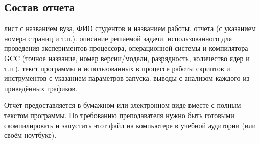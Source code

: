 \subsection{Состав отчета}

\begin{enumerate}
     лист с названием вуза, ФИО студентов и названием работы.
     отчета (с указанием номера страниц и т.п.).
     описание решаемой задачи.
     использованного для проведения экспериментов процессора, операционной системы и компилятора GCC (точное название, номер версии/модели, разрядность, количество ядер и т.п.).
     текст программы и использованных в процессе работы скриптов и инструментов с указанием параметров запуска.
     выводы с анализом каждого из приведённых графиков.
\end{enumerate}

Отчёт предоставляется в бумажном или электронном виде вместе с полным текстом программы. По требованию преподавателя нужно быть готовыми скомпилировать и запустить этот файл на компьютере в учебной аудитории (или своём ноутбуке).
